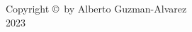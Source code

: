 \pagestyle{plain}
\normalsize

\begin{center}
Copyright \copyright\ by Alberto Guzman-Alvarez\\
2023
\end{center}

\newpage


